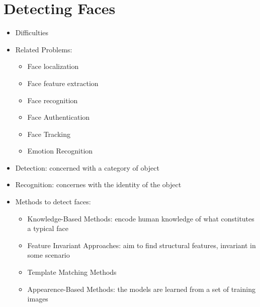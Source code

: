 \documentclass[12pt,oneside]{report}
\begin{document}
\chapter{Detecting Faces}
\begin{itemize}
    \item Difficulties
    \item Related Problems:
    \begin{itemize}
        \item Face localization
        \item Face feature extraction
        \item Face recognition
        \item Face Authentication
        \item Face Tracking
        \item Emotion Recognition
    \end{itemize}
    \item Detection: concerned with a category of object
    \item Recognition: concernes with the identity of the object
    \item Methods to detect faces:
    \begin{itemize}
        \item Knowledge-Based Methods: encode human knowledge of what constitutes a typical face
        \item Feature Invariant Approaches: aim to find structural features, invariant in some scenario
        \item Template Matching Methods
        \item Appearence-Based Methods: the models are learned from a set of training images
    \end{itemize}
\end{itemize}
\end{document}
